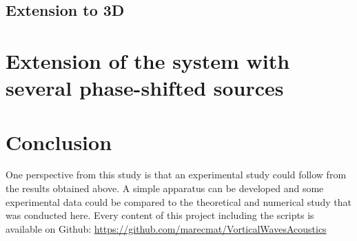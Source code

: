 \documentclass[%
 reprint,
 amsmath,amssymb,
 aip,
]{revtex4-1}
\begin{document}
\subsection{Extension to 3D}
\section{Extension of the system with several phase-shifted sources}

\section{Conclusion}
One perspective from this study is that an experimental study could follow from the results obtained above. A simple apparatus can be developed and some experimental data could be compared to the theoretical and numerical study that was conducted here. Every content of this project including the scripts is available on Github: \url{https://github.com/marecmat/VorticalWavesAcoustics}


\end{document}
